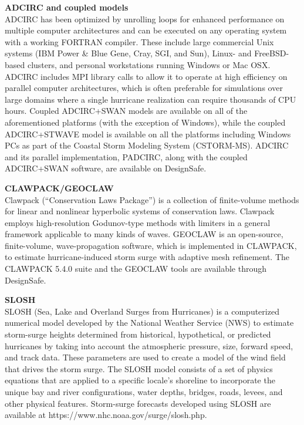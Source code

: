 \noindent\textbf{ADCIRC and coupled models} \\ADCIRC has been optimized by unrolling loops for enhanced performance on multiple computer architectures and can be executed on any operating system with a working FORTRAN compiler. These include large commercial Unix systems (IBM Power & Blue Gene, Cray, SGI, and Sun), Linux- and FreeBSD-based clusters, and personal workstations running Windows or Mac OSX. ADCIRC includes MPI library calls to allow it to operate at high efficiency on parallel computer architectures, which is often preferable for simulations over large domains where a single hurricane realization can require thousands of CPU hours. Coupled ADCIRC+SWAN models are available on all of the aforementioned platforms (with the exception of Windows), while the coupled ADCIRC+STWAVE model is available on all the platforms including Windows PCs as part of the Coastal Storm Modeling System (CSTORM-MS). ADCIRC and its parallel implementation, PADCIRC, along with the coupled ADCIRC+SWAN software, are available on DesignSafe.
\newline

\noindent\textbf{CLAWPACK/GEOCLAW} \\Clawpack (“Conservation Laws Package”) is a collection of finite-volume methods for linear and nonlinear hyperbolic systems of conservation laws. Clawpack employs high-resolution Godunov-type methods with limiters in a general framework applicable to many kinds of waves. GEOCLAW is an open-source, finite-volume, wave-propagation software, which is implemented in CLAWPACK, to estimate hurricane-induced storm surge with adaptive mesh refinement. The CLAWPACK 5.4.0 suite and the GEOCLAW tools are available through DesignSafe.
\newline

\noindent\textbf{SLOSH} \\SLOSH (Sea, Lake and Overland Surges from Hurricanes) is a computerized numerical model developed by the National Weather Service (NWS) to estimate storm-surge heights determined from historical, hypothetical, or predicted hurricanes by taking into account the atmospheric pressure, size, forward speed, and track data. These parameters are used to create a model of the wind field that drives the storm surge. The SLOSH model consists of a set of physics equations that are applied to a specific locale's shoreline to incorporate the unique bay and river configurations, water depths, bridges, roads, levees, and other physical features. Storm-surge forecasts developed using SLOSH are available at https://www.nhc.noaa.gov/surge/slosh.php.

